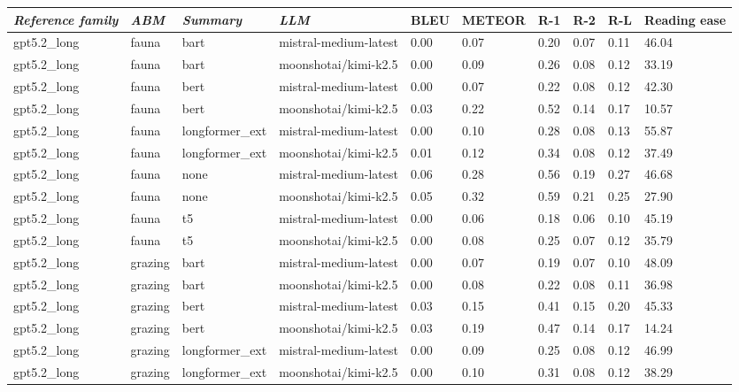 \begin{tabular}{|l|l|l|l|l|l|l|l|l|l|}
\hline
\textit{\textbf{Reference family}} & \textit{\textbf{ABM}} & \textit{\textbf{Summary}} & \textit{\textbf{LLM}} & BLEU & METEOR & R-1 & R-2 & R-L & Reading ease \\
 \hline
 gpt5.2\_long & fauna & bart & mistral-medium-latest & 0.00 & 0.07 & 0.20 & 0.07 & 0.11 & 46.04 \\
 \hline
 gpt5.2\_long & fauna & bart & moonshotai/kimi-k2.5 & 0.00 & 0.09 & 0.26 & 0.08 & 0.12 & 33.19 \\
 \hline
 gpt5.2\_long & fauna & bert & mistral-medium-latest & 0.00 & 0.07 & 0.22 & 0.08 & 0.12 & 42.30 \\
 \hline
 gpt5.2\_long & fauna & bert & moonshotai/kimi-k2.5 & 0.03 & 0.22 & 0.52 & 0.14 & 0.17 & 10.57 \\
 \hline
 gpt5.2\_long & fauna & longformer\_ext & mistral-medium-latest & 0.00 & 0.10 & 0.28 & 0.08 & 0.13 & 55.87 \\
 \hline
 gpt5.2\_long & fauna & longformer\_ext & moonshotai/kimi-k2.5 & 0.01 & 0.12 & 0.34 & 0.08 & 0.12 & 37.49 \\
 \hline
 gpt5.2\_long & fauna & none & mistral-medium-latest & 0.06 & 0.28 & 0.56 & 0.19 & 0.27 & 46.68 \\
 \hline
 gpt5.2\_long & fauna & none & moonshotai/kimi-k2.5 & 0.05 & 0.32 & 0.59 & 0.21 & 0.25 & 27.90 \\
 \hline
 gpt5.2\_long & fauna & t5 & mistral-medium-latest & 0.00 & 0.06 & 0.18 & 0.06 & 0.10 & 45.19 \\
 \hline
 gpt5.2\_long & fauna & t5 & moonshotai/kimi-k2.5 & 0.00 & 0.08 & 0.25 & 0.07 & 0.12 & 35.79 \\
 \hline
 gpt5.2\_long & grazing & bart & mistral-medium-latest & 0.00 & 0.07 & 0.19 & 0.07 & 0.10 & 48.09 \\
 \hline
 gpt5.2\_long & grazing & bart & moonshotai/kimi-k2.5 & 0.00 & 0.08 & 0.22 & 0.08 & 0.11 & 36.98 \\
 \hline
 gpt5.2\_long & grazing & bert & mistral-medium-latest & 0.03 & 0.15 & 0.41 & 0.15 & 0.20 & 45.33 \\
 \hline
 gpt5.2\_long & grazing & bert & moonshotai/kimi-k2.5 & 0.03 & 0.19 & 0.47 & 0.14 & 0.17 & 14.24 \\
 \hline
 gpt5.2\_long & grazing & longformer\_ext & mistral-medium-latest & 0.00 & 0.09 & 0.25 & 0.08 & 0.12 & 46.99 \\
 \hline
 gpt5.2\_long & grazing & longformer\_ext & moonshotai/kimi-k2.5 & 0.00 & 0.10 & 0.31 & 0.08 & 0.12 & 38.29 \\

\end{tabular}

